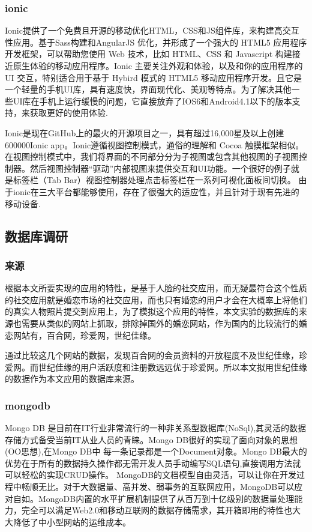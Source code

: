 \subsubsection{ionic}
Ionic提供了一个免费且开源的移动优化HTML，CSS和JS组件库，来构建高交互性应用。基于Sass构建和AngularJS 优化，并形成了一个强大的 HTML5 应用程序开发框架，可以帮助您使用 Web 技术，比如 HTML、CSS 和 Javascript 构建接近原生体验的移动应用程序。Ionic 主要关注外观和体验，以及和你的应用程序的 UI 交互，特别适合用于基于 Hybird 模式的 HTML5 移动应用程序开发。且它是一个轻量的手机UI库，具有速度快，界面现代化、美观等特点。为了解决其他一些UI库在手机上运行缓慢的问题，它直接放弃了IOS6和Android4.1以下的版本支持，来获取更好的使用体验.


Ionic是现在GitHub上的最火的开源项目之一，具有超过16,000星及以上创建600000Ionic app。Ionic遵循视图控制模式，通俗的理解和 Cocoa 触摸框架相似。在视图控制模式中，我们将界面的不同部分分为子视图或包含其他视图的子视图控制器。然后视图控制器“驱动”内部视图来提供交互和UI功能。一个很好的例子就是标签栏（Tab Bar）视图控制器处理点击标签栏在一系列可视化面板间切换。
由于ionic在三大平台都能够使用，存在了很强大的适应性，并且针对于现有先进的移动设备.

\subsection{数据库调研}
\subsubsection{来源}
根据本文所要实现的应用的特性，是基于人脸的社交应用，而无疑最符合这个性质的社交应用就是婚恋市场的社交应用，而也只有婚恋的用户才会在大概率上将他们的真实人物照片提交到应用上，为了模拟这个应用的特性，本文实验的数据库的来源也需要从类似的网站上抓取，排除掉国外的婚恋网站，作为国内的比较流行的婚恋网站有，百合网，珍爱网，世纪佳缘。


通过比较这几个网站的数据，发现百合网的会员资料的开放程度不及世纪佳缘，珍爱网。而世纪佳缘的用户活跃度和注册数远远优于珍爱网。所以本文拟用世纪佳缘的数据作为本文应用的数据库来源。
\subsubsection{mongodb}
Mongo DB 是目前在IT行业非常流行的一种非关系型数据库(NoSql),其灵活的数据存储方式备受当前IT从业人员的青睐。Mongo DB很好的实现了面向对象的思想(OO思想),在Mongo DB中 每一条记录都是一个Document对象。Mongo DB最大的优势在于所有的数据持久操作都无需开发人员手动编写SQL语句,直接调用方法就可以轻松的实现CRUD操作。
MongoDB的文档模型自由灵活，可以让你在开发过程中畅顺无比。对于大数据量、高并发、弱事务的互联网应用，MongoDB可以应对自如。MongoDB内置的水平扩展机制提供了从百万到十亿级别的数据量处理能力，完全可以满足Web2.0和移动互联网的数据存储需求，其开箱即用的特性也大大降低了中小型网站的运维成本。


